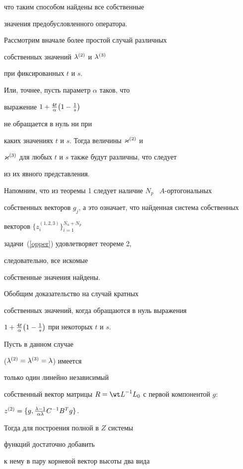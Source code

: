 \begin{pf}
что таким способом найдены все собственные 


значения предобусловленного оператора.





Рассмотрим вначале более простой случай различных


собственных значений $\lambda^{(2)}$ и $\lambda^{(3)}$


при фиксированных $t$ и $s$.


Или, точнее, пусть параметр $\alpha$ таков, что


выражение $1+\frac{4t}{\alpha}\big(1-\frac1{s}\big)$


не обращается в нуль ни при


каких значениях $t$ и $s$. Тогда величины $\varkappa^{(2)}$ и


$\varkappa^{(3)}$ для любых $t$ и $s$ также будут различны, что следует


из их явного представления.


Напомним, что из теоремы 1 следует наличие $N_p$ \ $A$-ортогональных


собственных векторов $g_j$, а это означает, что найденная система собственных


векторов $\{z_i^{(1,2,3)}\}_{i=1}^{N_u+N_p}$


задачи~(\ref{opper}) удовлетворяет теореме 2,


следовательно, все искомые


собственные значения найдены.





Обобщим доказательство на случай кратных


собственных значений, когда обращаются в нуль выражения


$1+\frac{4t}{\alpha}\big(1-\frac1{s}\big)$ при некоторых $t$ и $s$.


Пусть в данном случае


($\lambda^{(2)} = \lambda^{(3)} = \lambda$) имеется


только один линейно независимый


собственный вектор матрицы $R={\wt L}^{-1}L_0$ с первой компонентой $g$:


$z^{(2)}=\{g, \frac{\lambda-1}{\alpha \lambda} C^{-1} B^T g\}$.


Тогда для построения полной в $ Z $ системы


функций достаточно добавить


к нему в пару корневой вектор высоты два вида



\end{pf}
